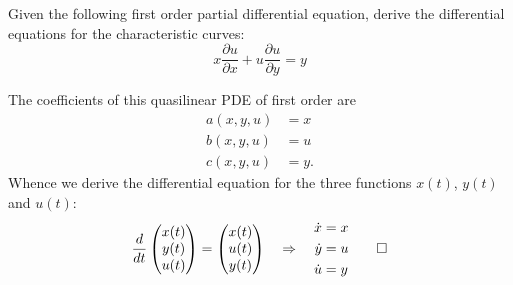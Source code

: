 Given the following first order partial differential equation, derive
the differential equations for the characteristic curves:
\[
x
\frac{\partial u}{\partial x}
+
u
\frac{\partial u}{\partial y}
=
y
\]

\begin{loesung}
The coefficients of this quasilinear PDE of first order are
\begin{align*}
a(x,y,u)&= x \\
b(x,y,u)&= u \\
c(x,y,u)&= y.
\end{align*}
Whence we derive the differential equation for the three functions
$x(t)$, $y(t)$ and $u(t)$:
\[
\frac{d}{dt}
\begin{pmatrix}
x(t)\\y(t)\\u(t)
\end{pmatrix}
=
\begin{pmatrix}
x(t)\\u(t)\\y(t)
\end{pmatrix}
\quad\Rightarrow\quad
\begin{aligned}
\dot{x}&=x\\
\dot{y}&=u\\
\dot{u}&=y
\end{aligned}
\qedhere
\]
\end{loesung}
